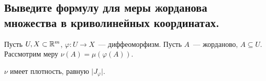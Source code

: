 
\subsection{Выведите формулу для меры жорданова множества в криволинейных координатах.}

Пусть $U, X \subset \mathbb{R}^m$, $\varphi:U \to X$~--- диффеоморфизм. Пусть $A$~--- жорданово, $A \subseteq U$. Рассмотрим меру $\nu(A) = \mu(\varphi(A))$. 

\begin{proposition*}
    $\nu$ имеет плотность, равную $\lvert J_\varphi \rvert$.
\end{proposition*}

